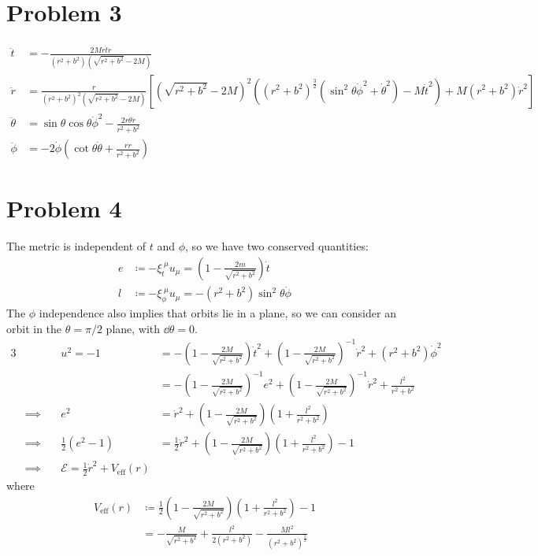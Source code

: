 \documentclass[12pt]{article}
\begin{document}
\section*{Problem 3}
\begin{align*}
    \ddot{t} &= -\frac{2Mr\dot{t}\dot{r}}{(r^2 + b^2)\left(\sqrt{r^2 + b^2} - 2M\right)} \\
    \ddot{r} &= \frac{r}{(r^2 + b^2)^2 \left(\sqrt{r^2 + b^2} - 2M\right)} \left[\left(\sqrt{r^2 + b^2} - 2M\right)^2\left((r^2 + b^2)^{\frac{3}{2}}\left(\sin^2\theta\dot{\phi}^2 + \dot{\theta}^2\right) - M\dot{t}^2\right) + M(r^2 + b^2)\dot{r}^2\right] \\
    \ddot{\theta} &= \sin\theta\cos\theta\dot{\phi}^2 - \frac{2r\dot{\theta}\dot{r}}{r^2 + b^2} \\
    \ddot{\phi} &= -2\dot{\phi}\left(\cot\theta\dot{\theta} + \frac{r\dot{r}}{r^2 + b^2}\right)
\end{align*}


\section*{Problem 4}
The metric is independent of $t$ and $\phi$, so we have two conserved quantities:
\begin{align*}
    e &\coloneqq -\xi_t^{\;\mu}u_\mu = \left(1 - \frac{2m}{\sqrt{r^2 + b^2}}\right)\dot{t} \\
    l &\coloneqq -\xi_\phi^{\;\mu}u_\mu = -(r^2 + b^2)\sin^2\theta\dot{\phi}
\end{align*}
The $\phi$ independence also implies that orbits lie in a plane, so we can consider an orbit in the $\theta = \pi/2$ plane, with $\dd\theta = 0$.
\begin{alignat}{3}
    & & u^2 = -1 &= -\left(1 - \frac{2M}{\sqrt{r^2 + b^2}}\right)\dot{t}^2 + \left(1 - \frac{2M}{\sqrt{r^2 + b^2}}\right)^{-1}\dot{r}^2 + (r^2 + b^2)\dot{\phi}^2 \nonumber \\
    & &  &= -\left(1 - \frac{2M}{\sqrt{r^2 + b^2}}\right)^{-1}e^2 + \left(1 - \frac{2M}{\sqrt{r^2 + b^2}}\right)^{-1}\dot{r}^2 + \frac{l^2}{r^2 + b^2} \nonumber \\
    &\implies \quad & e^2 &= \dot{r}^2 + \left(1 - \frac{2M}{\sqrt{r^2 + b^2}}\right)\left(1 + \frac{l^2}{r^2 + b^2}\right) \nonumber \\
    &\implies \quad & \frac{1}{2}(e^2 - 1) &= \frac{1}{2}\dot{r}^2 + \left(1 - \frac{2M}{\sqrt{r^2 + b^2}}\right)\left(1 + \frac{l^2}{r^2 + b^2}\right) - 1 \nonumber \\
    &\implies \quad & \mathcal{E} = \frac{1}{2}\dot{r}^2 + V_\text{eff}(r)
\end{alignat}
where
\begin{align}
    V_\text{eff}(r) &\coloneqq \frac{1}{2}\left(1 - \frac{2M}{\sqrt{r^2 + b^2}}\right)\left(1 + \frac{l^2}{r^2 + b^2}\right) - 1 \nonumber \\
    &= -\frac{M}{\sqrt{r^2 + b^2}} + \frac{l^2}{2(r^2 + b^2)} - \frac{Ml^2}{(r^2 + b^2)^{\frac{3}{2}}}
\end{align}
\end{document}
